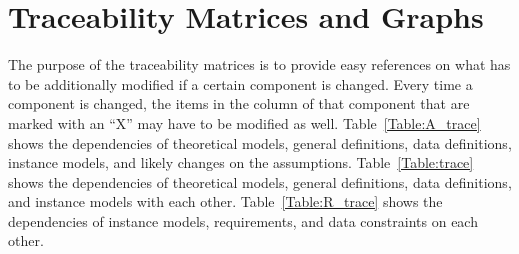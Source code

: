 \documentclass[12pt]{article}
\begin{document}
\section{Traceability Matrices and Graphs}

The purpose of the traceability matrices is to provide easy references on what
has to be additionally modified if a certain component is changed.  Every time a
component is changed, the items in the column of that component that are marked
with an ``X'' may have to be modified as well. Table~\ref{Table:A_trace} shows the dependencies of theoretical models,
general definitions, data definitions, instance models, and likely changes on
the assumptions. Table~\ref{Table:trace} shows the
dependencies of theoretical models, general definitions, data definitions, and
instance models with each other. Table~\ref{Table:R_trace} shows the
dependencies of instance models, requirements, and data constraints on each
other. 
\end{document}

